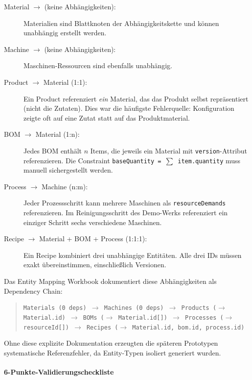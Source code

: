 \begin{description}
    \item[Material $\rightarrow$ (keine Abhängigkeiten):] Materialien sind Blattknoten der Abhängigkeitskette und können unabhängig erstellt werden.

    \item[Machine $\rightarrow$ (keine Abhängigkeiten):] Maschinen-Ressourcen sind ebenfalls unabhängig.

    \item[Product $\rightarrow$ Material (1:1):] Ein Product referenziert \textit{ein} Material, das das Produkt selbst repräsentiert (nicht die Zutaten). Dies war die häufigste Fehlerquelle: Konfiguration zeigte oft auf eine Zutat statt auf das Produktmaterial.

    \item[BOM $\rightarrow$ Material (1:n):] Jedes BOM enthält $n$ Items, die jeweils ein Material mit \texttt{version}-Attribut referenzieren. Die Constraint \texttt{baseQuantity = $\sum$ item.quantity} muss manuell sichergestellt werden.

    \item[Process $\rightarrow$ Machine (n:m):] Jeder Prozessschritt kann mehrere Maschinen als \texttt{resourceDemands} referenzieren. Im Reinigungsschritt des Demo-Werks referenziert ein einziger Schritt sechs verschiedene Maschinen.

    \item[Recipe $\rightarrow$ Material + BOM + Process (1:1:1):] Ein Recipe kombiniert drei unabhängige Entitäten. Alle drei IDs müssen exakt übereinstimmen, einschließlich Versionen.
\end{description}

Das Entity Mapping Workbook dokumentiert diese Abhängigkeiten als Dependency Chain:

\begin{quote}
\small
\texttt{Materials (0 deps) $\rightarrow$ Machines (0 deps) $\rightarrow$ Products ($\rightarrow$ Material.id) $\rightarrow$ BOMs ($\rightarrow$ Material.id[]) $\rightarrow$ Processes ($\rightarrow$ resourceId[]) $\rightarrow$ Recipes ($\rightarrow$ Material.id, bom.id, process.id)}
\end{quote}

Ohne diese explizite Dokumentation erzeugten die späteren Prototypen systematische Referenzfehler, da Entity-Typen isoliert generiert wurden.

\paragraph{6-Punkte-Validierungscheckliste}

